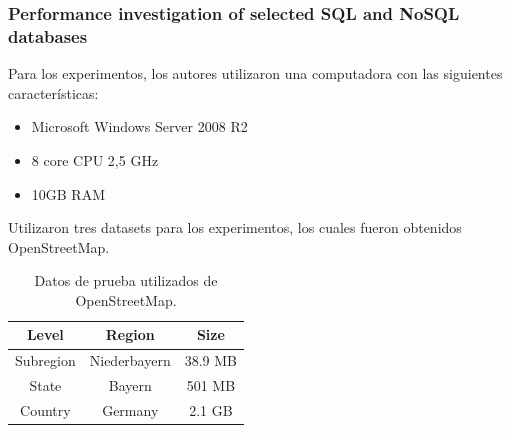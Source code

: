 \begin{frame}
    \frametitle{Performance investigation of selected SQL and NoSQL databases}

    Para los experimentos, los autores utilizaron una computadora con las siguientes características:

    \begin{itemize}
        \item Microsoft Windows Server 2008 R2
        \item 8 core CPU 2,5 GHz
        \item 10GB RAM
    \end{itemize}

     
    
    Utilizaron tres datasets para los experimentos, los cuales fueron obtenidos OpenStreetMap.

     
    
    \begin{table}[h]
        \centering
        \begin{tabular}{ |c|c|c| }
        \hline
        Level & Region & Size \\ 
        \hline
        Subregion & Niederbayern & 38.9 MB \\
        State & Bayern & 501 MB \\ 
        Country & Germany & 2.1 GB \\
        \hline
        \end{tabular}
        \caption{Datos de prueba utilizados de OpenStreetMap.}
    \end{table}
    
\end{frame}

